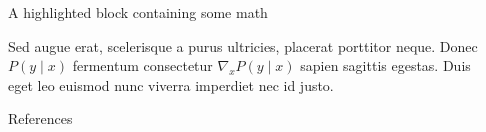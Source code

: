 \documentclass[final]{beamer}
\newlength{\sepwidth}
\newlength{\colwidth}
\newcommand{\separatorcolumn}{\begin{column}{\sepwidth}\end{column}}
\begin{document}
\begin{frame}[t]
\begin{columns}[t]
\begin{column}{\colwidth}
\begin{exampleblock}{A highlighted block containing some math}

    Sed augue erat, scelerisque a purus ultricies, placerat porttitor neque.
    Donec $P(y \mid x)$ fermentum consectetur $\nabla_x P(y \mid x)$ sapien
    sagittis egestas. Duis eget leo euismod nunc viverra imperdiet nec id
    justo.

  \end{exampleblock}

 
  \begin{block}{References}

    \nocite{*}
    \footnotesize{}

  \end{block}

\end{column}

\separatorcolumn
\end{columns}
\end{frame}
\end{document}
